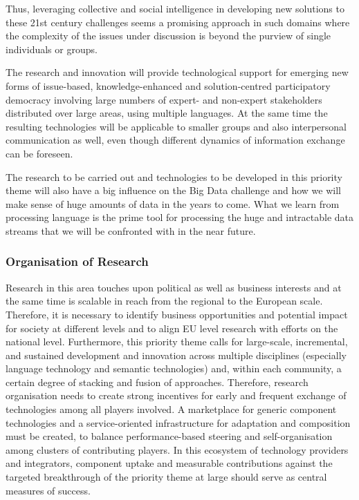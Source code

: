 \documentclass[10pt, plain]{../../metanetpaper}
\begin{document}
\begin{multicols}{2}
Thus, leveraging collective and social intelligence in developing new solutions to these 21st century challenges seems a promising approach in such domains where the complexity of the issues under discussion is beyond the purview of single individuals or groups.

The research and innovation will provide technological support for emerging new forms of issue-based, knowledge-enhanced and solution-centred participatory democracy involving large numbers of expert- and non-expert stakeholders distributed over large areas, using multiple languages. At the same time the resulting technologies will be applicable to smaller groups and also interpersonal communication as well, even though different dynamics of information exchange can be foreseen.

The research to be carried out and technologies to be developed in this priority theme will also have a big influence on the Big Data challenge and how we will make sense of huge amounts of data in the years to come. What we learn from processing language is the prime tool for processing the huge and intractable data streams that we will be confronted with in the near future.

\subsubsection{Organisation of Research}
\label{sec:organ-rese-pt2}

Research in this area touches upon political as well as business interests and at the same time is scalable in reach from the regional to the European scale. Therefore, it is necessary to identify business opportunities and potential impact for society at different levels and to align EU level research with efforts on the national level. Furthermore, this priority theme calls for large-scale, incremental, and sustained development and innovation across multiple disciplines (especially language technology and semantic technologies) and, within each community, a certain degree of stacking and fusion of approaches. Therefore, research organisation needs to create strong incentives for early and frequent exchange of technologies among all players involved. A marketplace for generic component technologies and a service-oriented infrastructure for adaptation and composition must be created, to balance performance-based steering and self-organisation among clusters of contributing players. In this ecosystem of technology providers and integrators, component uptake and measurable contributions against the targeted breakthrough of the priority theme at large should serve as central measures of success.


\end{multicols}
\end{document}
